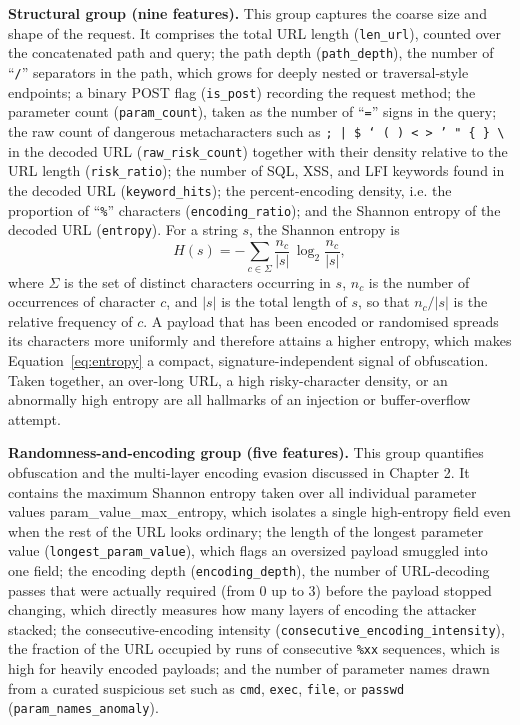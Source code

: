 \documentclass[../main.tex]{subfiles}
\begin{document}
\textbf{Structural group (nine features).} This group captures the coarse
size and shape of the request. It comprises the total URL length
(\texttt{len\_url}), counted over the concatenated path and query; the path
depth (\texttt{path\_depth}), the number of ``\texttt{/}'' separators in the
path, which grows for deeply nested or traversal-style endpoints; a binary
POST flag (\texttt{is\_post}) recording the request method; the parameter
count (\texttt{param\_count}), taken as the number of ``\texttt{=}'' signs in
the query; the raw count of dangerous metacharacters such as
\texttt{; | \$ ` ( ) < > ' " \{ \} \textbackslash} in the decoded URL
(\texttt{raw\_risk\_count}) together with their density relative to the URL
length (\texttt{risk\_ratio}); the number of SQL, XSS, and LFI keywords found
in the decoded URL (\texttt{keyword\_hits}); the percent-encoding density,
i.e. the proportion of ``\texttt{\%}'' characters
(\texttt{encoding\_ratio}); and the Shannon entropy of the decoded URL
(\texttt{entropy}). For a string $s$, the Shannon entropy is
\begin{equation}
  H(s) = -\sum_{c \in \Sigma} \frac{n_c}{|s|}\,\log_2 \frac{n_c}{|s|},
  \label{eq:entropy}
\end{equation}
where $\Sigma$ is the set of distinct characters occurring in $s$, $n_c$ is
the number of occurrences of character $c$, and $|s|$ is the total length of
$s$, so that $n_c/|s|$ is the relative frequency of $c$. A payload that has
been encoded or randomised spreads its characters more uniformly and
therefore attains a higher entropy, which makes Equation~\eqref{eq:entropy} a
compact, signature-independent signal of obfuscation. Taken together, an
over-long URL, a high risky-character density, or an abnormally high entropy
are all hallmarks of an injection or buffer-overflow attempt.

\textbf{Randomness-and-encoding group (five features).} This group
quantifies obfuscation and the multi-layer encoding evasion discussed in
Chapter 2. It contains the maximum Shannon entropy taken over all individual
parameter values param\_value\_max\_entropy, which isolates a
single high-entropy field even when the rest of the URL looks ordinary; the
length of the longest parameter value (\texttt{longest\_param\_value}), which
flags an oversized payload smuggled into one field; the encoding depth
(\texttt{encoding\_depth}), the number of URL-decoding passes that were
actually required (from $0$ up to $3$) before the payload stopped changing,
which directly measures how many layers of encoding the attacker stacked; the
consecutive-encoding intensity (\texttt{consecutive\_encoding\_intensity}),
the fraction of the URL occupied by runs of consecutive \texttt{\%xx}
sequences, which is high for heavily encoded payloads; and the number of
parameter names drawn from a curated suspicious set such as \texttt{cmd},
\texttt{exec}, \texttt{file}, or \texttt{passwd}
(\texttt{param\_names\_anomaly}).
\end{document}

